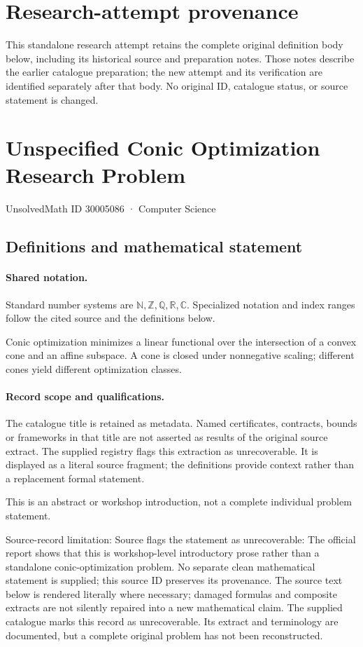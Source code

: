 \documentclass[11pt]{article}
\begin{document}
\section*{Research-attempt provenance}
This standalone research attempt retains the complete original definition body below,
including its historical source and preparation notes. Those notes describe the
earlier catalogue preparation; the new attempt and its verification are identified
separately after that body. No original ID, catalogue status, or source statement is changed.

\section{Unspecified Conic Optimization Research Problem}\label{30005086}
{\small UnsolvedMath ID 30005086 · Computer Science}
\subsection{Definitions and mathematical statement}

\paragraph{Shared notation.}Standard number systems are $\mathbb N,\mathbb Z,\mathbb Q,\mathbb R,\mathbb C$. Specialized notation and index ranges follow the cited source and the definitions below.


Conic optimization minimizes a linear functional over the intersection of a convex cone and an affine subspace. A cone is closed under nonnegative scaling; different cones yield different optimization classes.
\paragraph{Record scope and qualifications.}
The catalogue title is retained as metadata. Named certificates, contracts, bounds or frameworks in that title are not asserted as results of the original source extract.
The supplied registry flags this extraction as unrecoverable. It is displayed as a literal source fragment; the definitions provide context rather than a replacement formal statement.

This is an abstract or workshop introduction, not a complete individual problem statement.

Source-record limitation: Source flags the statement as unrecoverable: The official report shows that this is workshop-level introductory prose rather than a standalone conic-optimization problem. No separate clean mathematical statement is supplied; this source ID preserves its provenance.
The source text below is rendered literally where necessary; damaged formulas and composite extracts are not silently repaired into a new mathematical claim.
The supplied catalogue marks this record as unrecoverable. Its extract and terminology are documented, but a complete original problem has not been reconstructed.
\end{document}
